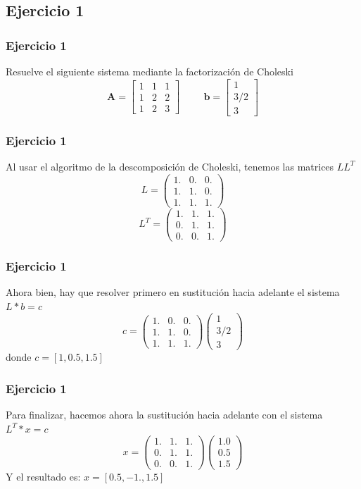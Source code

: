 \subsection*{Ejercicio 1}
\begin{frame}
\frametitle{Ejercicio 1}
Resuelve el siguiente sistema mediante la factorización de Choleski
\[ \mathbf{A} =
	\begin{bmatrix}
		 1 & 1 & 1 \\
		 1 & 2 & 2 \\
		 1 & 2 & 3
	\end{bmatrix}
	\hspace{1cm}
	\mathbf{b}=
	\begin{bmatrix}
		1 \\
		3/2 \\
		3
	\end{bmatrix} \]
\end{frame}
\begin{frame}
\frametitle{Ejercicio 1}
Al usar el algoritmo de la descomposición de Choleski, tenemos las matrices $LL^{T}$
\[ L = 
\begin{pmatrix}
1. & 0. & 0. \\
1. & 1. & 0. \\
1. & 1. & 1.
\end{pmatrix}
 \]
\[ L^{T} = 
\begin{pmatrix}
1. & 1. & 1. \\
0. & 1. & 1. \\
0. & 0. & 1.
\end{pmatrix} \]
\end{frame}
\begin{frame}
\frametitle{Ejercicio 1}
Ahora bien, hay que resolver primero en sustitución hacia adelante el sistema $L*b = c$
\[ c = 
\begin{pmatrix}
1. & 0. & 0. \\
1. & 1. & 0. \\
1. & 1. &  1.
\end{pmatrix}
\begin{pmatrix}
1 \\
3/2 \\
3
\end{pmatrix}\]
donde $c=[1,0.5,1.5]$
\end{frame}
\begin{frame}
\frametitle{Ejercicio 1}
Para finalizar, hacemos ahora la sustitución hacia adelante con el sistema $L^{T}*x = c$
\[ x = 
\begin{pmatrix}
1. & 1. & 1. \\
0. & 1. & 1. \\
0. & 0. & 1.
\end{pmatrix}
\begin{pmatrix}
1.0 \\
0.5 \\
1.5
\end{pmatrix}\]
Y el resultado es: $x=[0.5,-1.,1.5]$
\end{frame}
